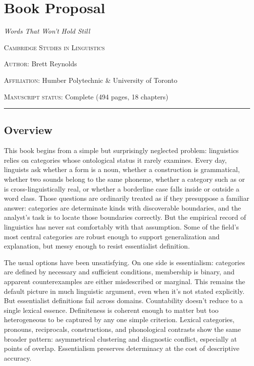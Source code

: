 \documentclass[11pt]{book}
\newcommand{\labelsc}[1]{{\mdseries\textsc{#1}}}
\newcommand*{\orcid}{\orcidlink{0000-0003-0073-7195}}
\begin{document}
\pagestyle{fancy}

\chapter*{Book Proposal}
\thispagestyle{plain}
\begin{center}
{\LARGE \emph{Words That Won't Hold Still} \par}
\vspace{0.75em}
{\large \textsc{Cambridge Studies in Linguistics} \par}
\vspace{0.75em}
\labelsc{Author:} Brett Reynolds\,\orcid \par
\labelsc{Affiliation:} Humber Polytechnic \& University of Toronto \par
\labelsc{Manuscript status:} Complete (494 pages, 18 chapters)
\end{center}

\hrule

\section{Overview}

This book begins from a simple but surprisingly neglected problem: linguistics relies on categories whose ontological status it rarely examines. Every day, linguists ask whether a form is a noun, whether a construction is grammatical, whether two sounds belong to the same phoneme, whether a category such as  or  is cross-linguistically real, or whether a borderline case falls inside or outside a word class. Those questions are ordinarily treated as if they presuppose a familiar answer: categories are determinate kinds with discoverable boundaries, and the analyst's task is to locate those boundaries correctly. But the empirical record of linguistics has never sat comfortably with that assumption. Some of the field's most central categories are robust enough to support generalization and explanation, but messy enough to resist essentialist definition.

The usual options have been unsatisfying. On one side is essentialism: categories are defined by necessary and sufficient conditions, membership is binary, and apparent counterexamples are either misdescribed or marginal. This remains the default picture in much linguistic argument, even when it's not stated explicitly. But essentialist definitions fail across domains. Countability doesn't reduce to a single lexical essence. Definiteness is coherent enough to matter but too heterogeneous to be captured by any one simple criterion. Lexical categories, pronouns, reciprocals, constructions, and phonological contrasts show the same broader pattern: asymmetrical clustering and diagnostic conflict, especially at points of overlap. Essentialism preserves determinacy at the cost of descriptive accuracy.
\end{document}
